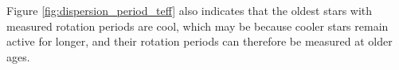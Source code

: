 Figure \ref{fig:dispersion_period_teff} also indicates that the oldest stars
with measured rotation periods are cool, which may be because cooler stars
remain active for longer, and their rotation periods can therefore be measured
at older ages.

